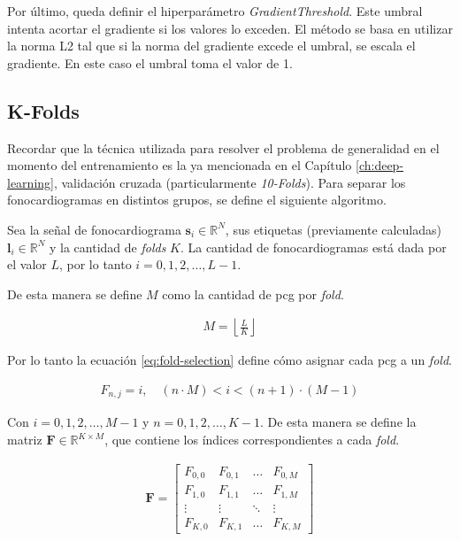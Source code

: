 \indent Por último, queda definir el hiperparámetro \textit{GradientThreshold}.
Este umbral intenta acortar el gradiente si los valores lo exceden.
El método se basa en utilizar la norma L2 tal que si la norma del gradiente
excede el umbral, se escala el gradiente.
En este caso el umbral toma el valor de 1.

\subsection{K-Folds} \label{subsec:k-folds}

\indent Recordar que la técnica utilizada para resolver el problema de generalidad en el momento del entrenamiento
es la ya mencionada en el Capítulo \ref{ch:deep-learning}, validación cruzada (particularmente
\textit{10-Folds}). Para separar los fonocardiogramas en distintos grupos, se define el siguiente algoritmo. \bigskip

\indent Sea la señal de fonocardiograma $\mathbf{s}_i \in \mathbb{R}^N$, sus etiquetas (previamente calculadas)
$\mathbf{l}_i \in \mathbb{R}^N$ y la cantidad de \textit{folds} $K$. La cantidad de fonocardiogramas está dada por
el valor $L$, por lo tanto $i = 0,1,2,\dots,L-1$. \bigskip

\indent De esta manera se define $M$ como la cantidad de \acrshort{pcg} por \textit{fold}.

\begin{align}
  M = \left\lfloor \frac{L}{K} \right\rfloor
\end{align}

\indent Por lo tanto la ecuación \ref{eq:fold-selection} define cómo asignar cada \acrshort{pcg} a un \textit{fold}.

\begin{align} \label{eq:fold-selection}
 F_{n,j} = i, \quad (n \cdot M) < i < (n+1) \cdot (M-1)
\end{align}

\indent Con $i=0,1,2,\dots,M-1$ y $n = 0,1,2,\dots,K-1$. De esta manera se define la matriz $\bm{F} \in
\mathbb{R}^{K \times M}$, que contiene los índices correspondientes a cada \textit{fold}.

\begin{align}
  \bm{F} = \left[\begin{array}{ccccc}
    F_{0,0} & F_{0,1} & \dots & F_{0,M} \\
    F_{1,0} & F_{1,1} & \dots & F_{1,M} \\
    \vdots  & \vdots  & \ddots & \vdots \\
    F_{K,0} & F_{K,1} & \dots & F_{K,M}
  \end{array}\right]
\end{align}

